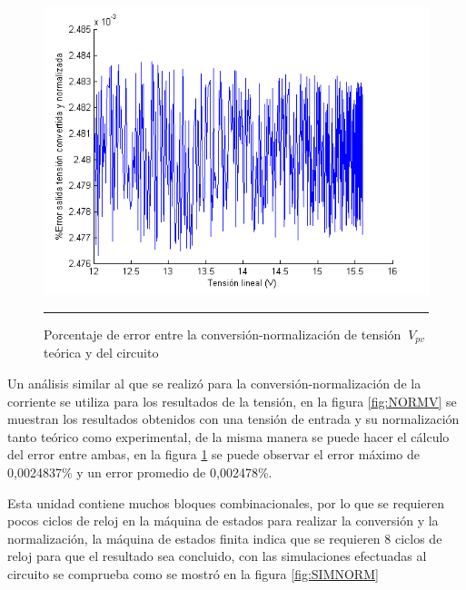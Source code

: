   \begin{figure}[H]
  \centering
    \includegraphics[scale=0.7]{./ERROR_CONV_NORM_V.png}
    \rule{35em}{0.5pt}
  \caption[Porcentaje de error entre la conversión-normalización de tensión $\ V_{pv}$ teórica y del circuito]{Porcentaje de error entre la conversión-normalización de tensión $\ V_{pv}$ teórica y del circuito}
  \label{fig:ENORMV}
\end{figure}

Un análisis similar al que se realizó para la conversión-normalización de la corriente se utiliza para los resultados de la tensión, en la figura \ref{fig:NORMV} se muestran los resultados obtenidos con una tensión de entrada y su normalización tanto teórico como experimental, de la misma manera se puede hacer el cálculo del error entre ambas, en la figura \ref{fig:ENORMV} se puede observar el error máximo de 0,0024837\% y un error promedio de 0,002478\%.

Esta unidad contiene muchos bloques combinacionales, por lo que se requieren pocos ciclos de reloj en la máquina de estados para realizar la conversión y la normalización, la máquina de estados finita indica que se requieren 8 ciclos de reloj para que el resultado sea concluido, con las simulaciones efectuadas al circuito se comprueba como se mostró en la  figura \ref{fig:SIMNORM} 
